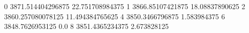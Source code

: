 0 3871.514404296875 22.751708984375
1 3866.85107421875 18.08837890625
2 3860.257080078125 11.494384765625
4 3850.3466796875 1.583984375
6 3848.7626953125 0.0
8 3851.4365234375 2.673828125
